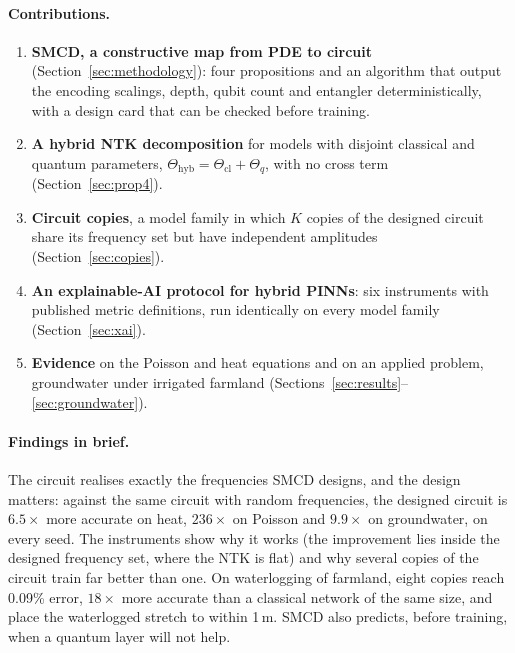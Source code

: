 \paragraph{Contributions.}
\begin{enumerate}
\item \textbf{SMCD, a constructive map from PDE to circuit}
  (Section~\ref{sec:methodology}): four propositions and an algorithm that output the
  encoding scalings, depth, qubit count and entangler deterministically, with a design
  card that can be checked before training.
\item \textbf{A hybrid NTK decomposition} for models with disjoint classical and quantum
  parameters, $\Theta_{\mathrm{hyb}}=\Theta_{\mathrm{cl}}+\Theta_q$, with no cross term
  (Section~\ref{sec:prop4}).
\item \textbf{Circuit copies}, a model family in which $K$ copies of the designed
  circuit share its frequency set but have independent amplitudes
  (Section~\ref{sec:copies}).
\item \textbf{An explainable-AI protocol for hybrid PINNs}: six instruments with
  published metric definitions, run identically on every model family
  (Section~\ref{sec:xai}).
\item \textbf{Evidence} on the Poisson and heat equations and on an applied problem,
  groundwater under irrigated farmland (Sections~\ref{sec:results}--\ref{sec:groundwater}).
\end{enumerate}

\paragraph{Findings in brief.} The circuit realises exactly the frequencies SMCD designs,
and the design matters: against the same circuit with random frequencies, the designed
circuit is $6.5\times$ more accurate on heat, $236\times$ on Poisson and $9.9\times$ on
groundwater, on every seed. The instruments show why it works (the improvement lies
inside the designed frequency set, where the NTK is flat) and why several copies of the
circuit train far better than one. On waterlogging of farmland, eight copies reach 0.09\%
error, $18\times$ more accurate than a classical network of the same size, and place the
waterlogged stretch to within 1\,m. SMCD also predicts, before training, when a quantum
layer will not help.
